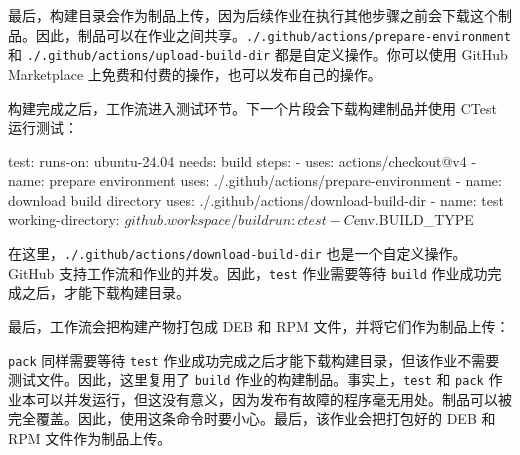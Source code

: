\label{idx:964}
最后，构建目录会作为制品上传，因为后续作业在执行其他步骤之前会下载这个制品。因此，制品可以在作业之间共享。\texttt{.\allowbreak{}/\allowbreak{}.\allowbreak{}github/\allowbreak{}actions/\allowbreak{}prepare-environment} 和 \texttt{.\allowbreak{}/\allowbreak{}.\allowbreak{}github/\allowbreak{}actions/\allowbreak{}upload-build-dir} 都是自定义操作。你可以使用 GitHub Marketplace 上免费和付费的操作，也可以发布自己的操作。

构建完成之后，工作流进入测试环节。下一个片段会下载构建制品并使用 CTest 运行测试：

\begin{codebox}[yaml]
  test:
    runs-on: ubuntu-24.04
    needs: build
    steps:
      - uses: actions/checkout@v4
      - name: prepare environment
        uses: ./.github/actions/prepare-environment
      - name: download build directory
        uses: ./.github/actions/download-build-dir
      - name: test
        working-directory: ${{github.workspace}}/build
        run: ctest -C ${{env.BUILD_TYPE}}
\end{codebox}

在这里，\texttt{.\allowbreak{}/\allowbreak{}.\allowbreak{}github/\allowbreak{}actions/\allowbreak{}download-build-dir} 也是一个自定义操作。GitHub 支持工作流和作业的并发。因此，\texttt{test} 作业需要等待 \texttt{build} 作业成功完成之后，才能下载构建目录。

最后，工作流会把构建产物打包成 DEB 和 RPM 文件，并将它们作为制品上传：


\label{idx:965}
\texttt{pack} 同样需要等待 \texttt{test} 作业成功完成之后才能下载构建目录，但该作业不需要测试文件。因此，这里复用了 \texttt{build} 作业的构建制品。事实上，\texttt{test} 和 \texttt{pack} 作业本可以并发运行，但这没有意义，因为发布有故障的程序毫无用处。制品可以被完全覆盖。因此，使用这条命令时要小心。最后，该作业会把打包好的 DEB 和 RPM 文件作为制品上传。

